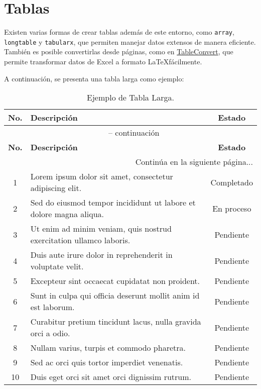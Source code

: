 \section{Tablas}
Existen varias formas de crear tablas además de este entorno, como \texttt{array}, \texttt{longtable} y \texttt{tabularx}, que permiten manejar datos extensos de manera eficiente. También es posible convertirlas desde páginas, como en \href{https://tableconvert.com/es/excel-to-latex}{TableConvert}, que permite transformar datos de Excel a formato \LaTeX fácilmente.

A continuación, se presenta una tabla larga como ejemplo:

\begin{longtable}{|c|p{10cm}|c|} %
	\caption{Ejemplo de Tabla Larga.} \label{tab:ejemplo_tabla} \\
	\hline
	\textbf{No.} & \textbf{Descripción} & \textbf{Estado} \\
	\hline
	\endfirsthead
	\multicolumn{3}{c}{{\tablename\ \thetable{} -- continuación}} \\
	\hline
	\textbf{No.} & \textbf{Descripción} & \textbf{Estado} \\
	\hline
	\endhead
	\hline \multicolumn{3}{r}{{Continúa en la siguiente página...}} \\
	\hline
	\endfoot
	\hline
	\endlastfoot
	1 & Lorem ipsum dolor sit amet, consectetur adipiscing elit. & Completado \\
	2 & Sed do eiusmod tempor incididunt ut labore et dolore magna aliqua. & En proceso \\
	3 & Ut enim ad minim veniam, quis nostrud exercitation ullamco laboris. & Pendiente \\
	4 & Duis aute irure dolor in reprehenderit in voluptate velit. & Pendiente \\
	5 & Excepteur sint occaecat cupidatat non proident. & Pendiente \\
	6 & Sunt in culpa qui officia deserunt mollit anim id est laborum. & Pendiente \\
	7 & Curabitur pretium tincidunt lacus, nulla gravida orci a odio. & Pendiente \\
	8 & Nullam varius, turpis et commodo pharetra. & Pendiente \\
	9 & Sed ac orci quis tortor imperdiet venenatis. & Pendiente \\
	10 & Duis eget orci sit amet orci dignissim rutrum. & Pendiente \\

\end{longtable}
